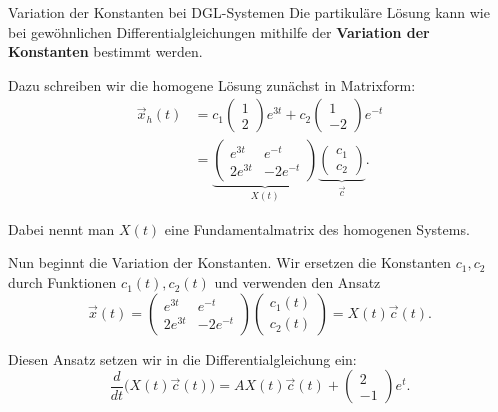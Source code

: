 \begin{bsp}{Variation der Konstanten bei DGL-Systemen}{}
    Die partikuläre Lösung kann wie bei gewöhnlichen
    Differentialgleichungen mithilfe der
    \textbf{Variation der Konstanten} bestimmt werden.

    Dazu schreiben wir die homogene Lösung zunächst in Matrixform:
    \[
        \begin{aligned}
            \vec{x}_h(t)
             & =
            c_1\begin{pmatrix}1\\2\end{pmatrix}e^{3t}
            +
            c_2\begin{pmatrix}1\\-2\end{pmatrix}e^{-t} \\[2mm]
             & =
            \underbrace{
                \begin{pmatrix}
                    e^{3t}  & e^{-t}   \\
                    2e^{3t} & -2e^{-t}
                \end{pmatrix}
            }_{X(t)}
            \underbrace{
                \begin{pmatrix}
                    c_1 \\c_2
                \end{pmatrix}
            }_{\vec{c}}.
        \end{aligned}
    \]

    Dabei nennt man \(X(t)\) eine Fundamentalmatrix des homogenen Systems.

    Nun beginnt die Variation der Konstanten.
    Wir ersetzen die Konstanten \(c_1,c_2\) durch Funktionen
    \(c_1(t),c_2(t)\) und verwenden den Ansatz
    \[
        \vec{x}(t)
        =
        \begin{pmatrix}
            e^{3t}  & e^{-t}   \\
            2e^{3t} & -2e^{-t}
        \end{pmatrix}
        \begin{pmatrix}
            c_1(t) \\c_2(t)
        \end{pmatrix}
        =
        X(t)\vec{c}(t).
    \]

    Diesen Ansatz setzen wir in die Differentialgleichung ein:
    \[
        \frac{d}{dt}\bigl(X(t)\vec{c}(t)\bigr)
        =
        AX(t)\vec{c}(t)
        +
        \begin{pmatrix}2\\-1\end{pmatrix}e^t.
    \]


\end{bsp}
